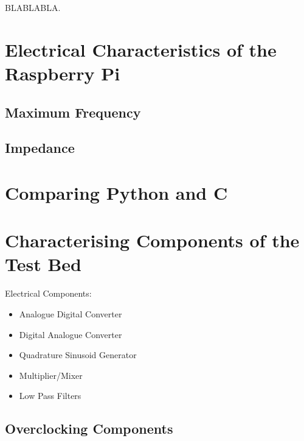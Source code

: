 \documentclass[../main.tex]{subfiles}
\begin{document}
BLABLABLA.


\section{Electrical Characteristics of the Raspberry Pi}
\subsection{Maximum Frequency}
\subsection{Impedance}


\section{Comparing Python and C} \label{sec_Comparing Python and C}


\section{Characterising Components of the Test Bed}

Electrical Components:
\begin{itemize}
	\item Analogue Digital Converter
	\item Digital Analogue Converter
	\item Quadrature Sinusoid Generator
	\item Multiplier/Mixer
	\item Low Pass Filters
\end{itemize}

\subsection{Overclocking Components}
\end{document}
